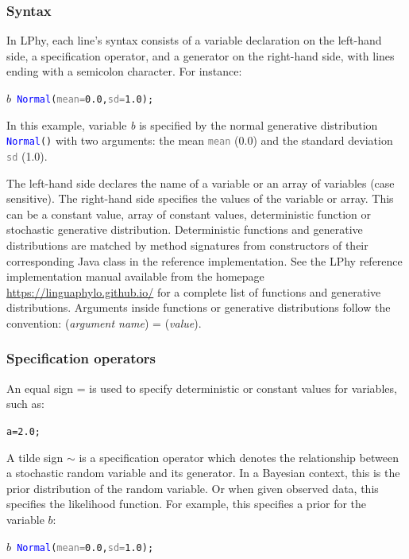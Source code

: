 \documentclass[10pt,letterpaper,table]{article}
\theoremstyle{definition}
\begin{document}
\subsubsection{Syntax}
In LPhy, each line's syntax consists of a variable declaration on the left-hand side, a specification operator, and a generator on the right-hand side, with lines ending with a semicolon character. 
For instance:
{
  \small
  \begin{listing}
    \begin{alltt}
    \textcolor{bluishgreen}{\(b\)}  ~ \textcolor{blue}{Normal}(\textcolor{gray}{mean=} \textcolor{constant}{0.0}, \textcolor{gray}{sd=}\textcolor{constant}{1.0});
    \end{alltt}    
  \end{listing}
}

In this example, variable \textit{\textcolor{bluishgreen}{b}} is specified by the normal generative distribution \texttt{\textcolor{blue}{Normal}()} with two arguments: the mean \texttt{\textcolor{gray}{mean}} (0.0) and the standard deviation \texttt{\textcolor{gray}{sd}} (1.0).

The left-hand side declares the name of a variable or an array of variables (case sensitive).
The right-hand side specifies the values of the variable or array. 
This can be a constant value, array of constant values, deterministic function or stochastic generative distribution.
Deterministic functions and generative distributions are matched by method signatures from constructors of their corresponding Java class in the reference implementation. 
See the LPhy reference implementation manual available from the homepage \url{https://linguaphylo.github.io/} for a complete list of functions and generative distributions. 
Arguments inside functions or generative distributions follow the convention: 
(\textit{argument name}) = (\textit{value}).

\subsubsection{Specification operators}
An equal sign = is used to specify deterministic or constant values for variables, such as: 
{
  \small
  \begin{listing}
    \begin{alltt}
    a = \textcolor{constant}{2.0};
    \end{alltt}
  \end{listing}
}
\noindent A tilde sign $\sim$ is a specification operator which denotes the relationship between a stochastic random variable and its generator. 
In a Bayesian context, this is the prior distribution of the random variable. 
Or when given observed data, this specifies the likelihood function. 
For example, this specifies a prior for the variable $b$:  
{
  \small
  \begin{listing}
    \begin{alltt}
    \textcolor{bluishgreen}{\(b\)} ~ \textcolor{blue}{Normal}(\textcolor{gray}{mean=}\textcolor{constant}{0.0}, \textcolor{gray}{sd=}\textcolor{constant}{1.0});
    \end{alltt}
  \end{listing}
}
\end{document}
